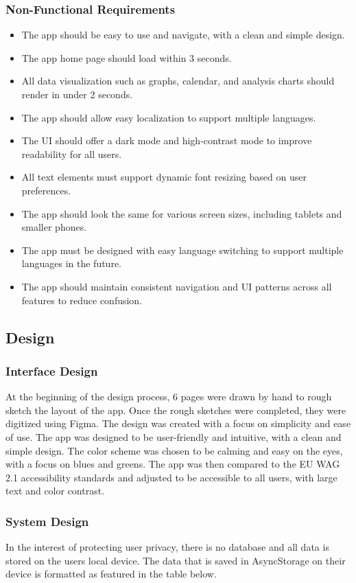 \subsubsection{Non-Functional Requirements}
\begin{itemize}
  \item The app should be easy to use and navigate, with a clean and simple design.
  \item The app home page should load within 3 seconds.
  \item All data visualization such as graphs, calendar, and analysis charts should render in under 2 seconds.
  \item The app should allow easy localization to support multiple languages.
  \item The UI should offer a dark mode and high-contrast mode to improve readability for all users.
  \item All text elements must support dynamic font resizing based on user preferences.
  \item The app should look the same for various screen sizes, including tablets and smaller phones.
  \item The app must be designed with easy language switching to support multiple languages in the future.
  \item The app should maintain consistent navigation and UI patterns across all features to reduce confusion.
\end{itemize}

\subsection{Design}

\subsubsection{Interface Design}
At the beginning of the design process, 6 pages were drawn by hand to rough sketch the layout of the app. Once the rough sketches were completed, they were digitized using Figma. The design was created with a focus on simplicity and ease of use. The app was designed to be user-friendly and intuitive, with a clean and simple design. The color scheme was chosen to be calming and easy on the eyes, with a focus on blues and greens. The app was then compared to the EU WAG 2.1 accessibility standards and adjusted to be accessible to all users, with large text and color contrast. 

\subsubsection{System Design}
In the interest of protecting user privacy, there is no database and all data is stored on the users local device. The data that is saved in AsyncStorage on their device is formatted as featured in the table below.

